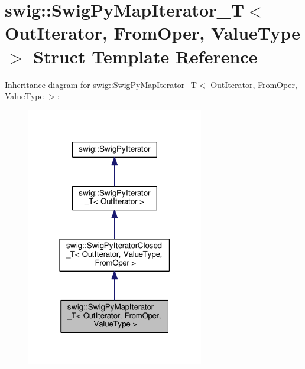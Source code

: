 \hypertarget{structswig_1_1SwigPyMapIterator__T}{}\section{swig\+:\+:Swig\+Py\+Map\+Iterator\+\_\+T$<$ Out\+Iterator, From\+Oper, Value\+Type $>$ Struct Template Reference}
\label{structswig_1_1SwigPyMapIterator__T}


Inheritance diagram for swig\+:\+:Swig\+Py\+Map\+Iterator\+\_\+T$<$ Out\+Iterator, From\+Oper, Value\+Type $>$\+:\nopagebreak
\begin{figure}[H]
\begin{center}
\leavevmode
\includegraphics[width=219pt]{structswig_1_1SwigPyMapIterator__T__inherit__graph}
\end{center}
\end{figure}


